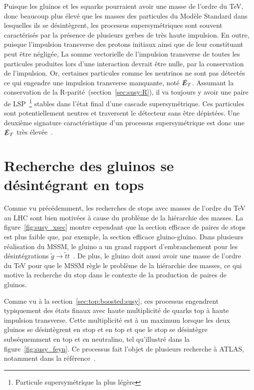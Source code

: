 Puisque les gluinos et les squarks pourraient avoir une masse de
l'ordre du TeV, donc beaucoup plus élevé que les masses des particules
du Modèle Standard dans lesquelles ils se désintègrent, les processus
supersymétriques sont souvent caractérisés par la présence de
plusieurs gerbes de très haute impulsion. En outre, puisque
l'impulsion transverse des protons initiaux ainsi que de leur
constituant peut être négligée, La somme vectorielle de l'impulsion
transverse de toutes les particules produites lors d'une interaction
devrait être nulle, par la conservation de l'impulsion. Or, certaines
particules comme les neutrinos ne sont pas détectés ce qui engendre
une impulsion transverse manquante, noté $\slashed{E}_T$. Assumant la
conservation de la R-parité~(section~\ref{sec:susy:R}), il va toujours
y avoir une paire de LSP~\footnote{Particule supersym\'etrique la plus
  l\'eg\`ere} stables dans l'état final d'une cascade
supersymétrique. Ces particules sont potentiellement neutres
 et traversent le détecteur sans être dépistées. Une deuxième signature
caractéristique d'un processus supersymétrique est donc une
$\slashed{E}_T$ très élevée~\cite{olive_susy2_2014}.


\section{Recherche des gluinos se désintégrant en tops}
\label{sec:susy_atlas:gtt}

Comme vu précédemment, les recherches de stops avec masses de l'ordre
du TeV au LHC sont bien motivées à cause du problème de la hiérarchie
des masses. La figure~\ref{fig:susy_xsec} montre cependant que la
section efficace de paires de stops est plus faible que, par exemple,
la section efficace gluino-gluino. Dans plusieurs réalisation du MSSM,
le gluino a un grand rapport d'embranchement pour les désintégrations
$\tilde{g} \rightarrow \tilde{t} t$~\cite{bandyopadhyay_boosted_2011}.
De plus, le gluino doit aussi avoir une masse de l'ordre du TeV pour
que le MSSM règle le problème de la hiérarchie des masses, ce qui
motive la recherche du stop dans le contexte de la production de
paires de gluinos.

Comme vu à la section~\ref{sec:top:boosted:susy}, ces processus
engendrent typiquement des états finaux avec haute multiplicité de
quarks top à haute impulsion transverse. Cette multiplicité est à un
maximum lorsque les deux gluinos se désintègrent en stop et en top et
que le stop se désintègre subséquemment en top et en neutralino, tel
qu'illustré dans la figure~\ref{fig:susy_feyn}. Ce processus fait l'objet
de plusieurs recherche à ATLAS, notamment dans la référence~\cite{ATLAS-CONF-2015-067}.

